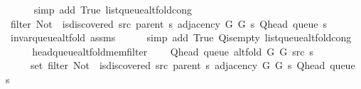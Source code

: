\begin{isabellebody}
\ \ \ \ \isamarkupfalse%
\ {\isacharparenleft}{\kern0pt}simp\ add{\isacharcolon}{\kern0pt}\ True\ list{\isacharunderscore}{\kern0pt}queue{\isacharunderscore}{\kern0pt}alt{\isacharunderscore}{\kern0pt}fold{\isacharunderscore}{\kern0pt}cong{\isacharparenright}{\kern0pt}\isanewline
\ \ \isamarkupfalse%
\ \isamarkupfalse%
\ {\isachardoublequoteopen}filter\ {\isacharparenleft}{\kern0pt}Not\ {\isasymcirc}\ is{\isacharunderscore}{\kern0pt}discovered\ src\ {\isacharparenleft}{\kern0pt}parent\ s{\isacharparenright}{\kern0pt}{\isacharparenright}{\kern0pt}\ {\isacharparenleft}{\kern0pt}adjacency\ G{}\ G{}\ s\ {\isacharparenleft}{\kern0pt}Q{\isacharunderscore}{\kern0pt}head\ {\isacharparenleft}{\kern0pt}queue\ s{\isacharparenright}{\kern0pt}{\isacharparenright}{\kern0pt}{\isacharparenright}{\kern0pt}\ {\isasymnoteq}\ {\isacharbrackleft}{\kern0pt}{\isacharbrackright}{\kern0pt}{\isachardoublequoteclose}\isanewline
\ \ \ \ \isamarkupfalse%
\ invar{\isacharunderscore}{\kern0pt}queue{\isacharunderscore}{\kern0pt}alt{\isacharunderscore}{\kern0pt}fold\ assms\isanewline
\ \ \ \ \isamarkupfalse%
\ {\isacharparenleft}{\kern0pt}simp\ add{\isacharcolon}{\kern0pt}\ True\ Q{\isachardot}{\kern0pt}is{\isacharunderscore}{\kern0pt}empty\ list{\isacharunderscore}{\kern0pt}queue{\isacharunderscore}{\kern0pt}alt{\isacharunderscore}{\kern0pt}fold{\isacharunderscore}{\kern0pt}cong{\isacharparenright}{\kern0pt}\isanewline
\ \ \isamarkupfalse%
\ \isamarkupfalse%
\ head{\isacharunderscore}{\kern0pt}queue{\isacharunderscore}{\kern0pt}alt{\isacharunderscore}{\kern0pt}fold{\isacharunderscore}{\kern0pt}mem{\isacharunderscore}{\kern0pt}filter{\isacharcolon}{\kern0pt}\isanewline
\ \ \ \ {\isachardoublequoteopen}Q{\isacharunderscore}{\kern0pt}head\ {\isacharparenleft}{\kern0pt}queue\ {\isacharparenleft}{\kern0pt}alt{\isacharunderscore}{\kern0pt}fold\ G{}\ G{}\ src\ s{\isacharparenright}{\kern0pt}{\isacharparenright}{\kern0pt}\ {\isasymin}\isanewline
\ \ \ \ \ set\ {\isacharparenleft}{\kern0pt}filter\ {\isacharparenleft}{\kern0pt}Not\ {\isasymcirc}\ is{\isacharunderscore}{\kern0pt}discovered\ src\ {\isacharparenleft}{\kern0pt}parent\ s{\isacharparenright}{\kern0pt}{\isacharparenright}{\kern0pt}\ {\isacharparenleft}{\kern0pt}adjacency\ G{}\ G{}\ s\ {\isacharparenleft}{\kern0pt}Q{\isacharunderscore}{\kern0pt}head\ {\isacharparenleft}{\kern0pt}queue\ s{\isacharparenright}{\kern0pt}{\isacharparenright}{\kern0pt}{\isacharparenright}{\kern0pt}{\isacharparenright}{\kern0pt}{\isachardoublequoteclose}\isanewline

\end{isabellebody}
